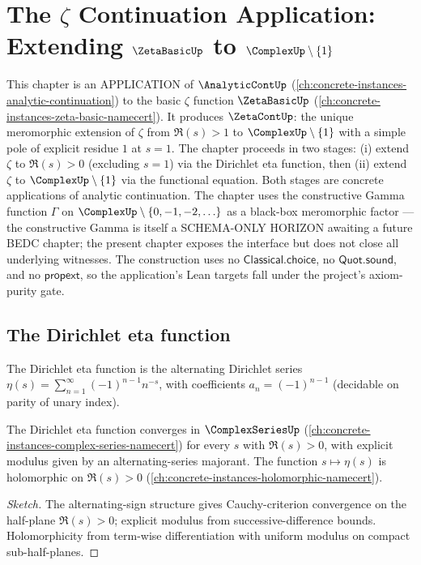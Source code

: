 \chapter{The \(\zeta\) Continuation Application: Extending \(\ZetaBasicUp\) to \(\ComplexUp \setminus \{1\}\)}
\label{ch:concrete-instances-zeta-continuation}

This chapter is an APPLICATION of \(\AnalyticContUp\) (\autoref{ch:concrete-instances-analytic-continuation}) to the basic \(\zeta\) function \(\ZetaBasicUp\) (\autoref{ch:concrete-instances-zeta-basic-namecert}). It produces \(\ZetaContUp\): the unique meromorphic extension of \(\zeta\) from \(\Re(s) > 1\) to \(\ComplexUp \setminus \{1\}\) with a simple pole of explicit residue \(1\) at \(s = 1\). The chapter proceeds in two stages: (i) extend \(\zeta\) to \(\Re(s) > 0\) (excluding \(s = 1\)) via the Dirichlet eta function, then (ii) extend \(\zeta\) to \(\ComplexUp \setminus \{1\}\) via the functional equation. Both stages are concrete applications of analytic continuation. The chapter uses the constructive Gamma function \(\Gamma\) on \(\ComplexUp \setminus \{0, -1, -2, \ldots\}\) as a black-box meromorphic factor --- the constructive Gamma is itself a SCHEMA-ONLY HORIZON awaiting a future BEDC chapter; the present chapter exposes the interface but does not close all underlying witnesses. The construction uses no \(\mathsf{Classical.choice}\), no \(\mathsf{Quot.sound}\), and no \(\mathsf{propext}\), so the application's Lean targets fall under the project's axiom-purity gate.

\section{The Dirichlet eta function}

\begin{definition}
\label{def:dirichlet-eta}
The Dirichlet eta function is the alternating Dirichlet series \(\eta(s) = \sum_{n=1}^{\infty} (-1)^{n-1} n^{-s}\), with coefficients \(a_n = (-1)^{n-1}\) (decidable on parity of unary index).
\end{definition}

\begin{theorem}
\label{thm:eta-well-defined}
The Dirichlet eta function converges in \(\ComplexSeriesUp\) (\autoref{ch:concrete-instances-complex-series-namecert}) for every \(s\) with \(\Re(s) > 0\), with explicit modulus given by an alternating-series majorant. The function \(s \mapsto \eta(s)\) is holomorphic on \(\Re(s) > 0\) (\autoref{ch:concrete-instances-holomorphic-namecert}).
\end{theorem}
\begin{proof}[Sketch]
The alternating-sign structure gives Cauchy-criterion convergence on the half-plane \(\Re(s) > 0\); explicit modulus from successive-difference bounds. Holomorphicity from term-wise differentiation with uniform modulus on compact sub-half-planes.
\end{proof}

